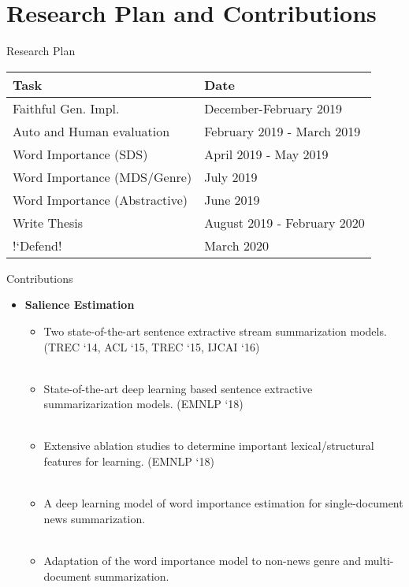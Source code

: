 \section{Research Plan and Contributions}

\begin{frame}{Research Plan}
    \centering
\begin{tabular}{|ll|}
    \toprule
    \textbf{Task} & \textbf{Date} \\
    \midrule
     Faithful Gen. Impl. & December-February 2019\\
    \hline
    Auto and Human evaluation  & February 2019 - March 2019\\
    \hline
    Word Importance (SDS) &  April 2019 - May 2019 \\
    \hline
    Word Importance (MDS/Genre) & July 2019 \\
    \hline
    Word Importance (Abstractive) & June 2019 \\
    \hline
    Write Thesis & August 2019 - February 2020 \\
    \hline
    !`Defend! & March 2020 \\
    \bottomrule
\end{tabular}


\end{frame}

\begin{frame}{Contributions}
 \begin{itemize}
  \item \textbf{Salience Estimation}
  \begin{itemize}
   \item[\color{green}\ding{51}] Two state-of-the-art sentence extractive 
       stream summarization models. 
       (TREC `14, ACL `15, TREC `15, IJCAI `16)~\\~\\
   \item[\color{green}\ding{51}] State-of-the-art deep learning based sentence
       extractive summarizarization models. 
       (EMNLP `18)~\\~\\
   \item[\color{green}\ding{51}] Extensive ablation studies to determine 
       important lexical/structural features for learning. 
       (EMNLP `18) ~\\~\\
   \item A deep learning model of word importance estimation for 
       single-document news summarization. ~\\~\\
   \item Adaptation of the word importance model to non-news genre and 
       multi-document summarization.
  \end{itemize}
 \end{itemize}
\end{frame}

